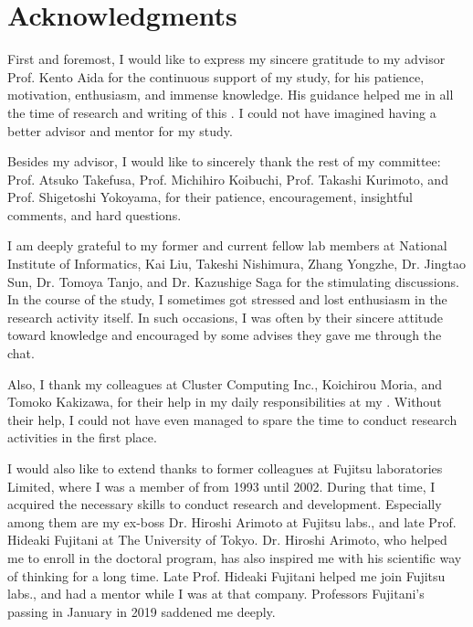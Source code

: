 \chapter*{Acknowledgments}

First and foremost, I would like to express my sincere gratitude to my advisor Prof. Kento Aida for the continuous support of my  study, for his patience, motivation, enthusiasm, and immense knowledge.
His guidance helped me in all the time of research and writing of this .
I could not have imagined having a better advisor and mentor for my  study.

Besides my advisor, I would like to sincerely thank the rest of my  committee: Prof. Atsuko Takefusa, Prof. Michihiro Koibuchi, Prof. Takashi Kurimoto, and Prof. Shigetoshi Yokoyama, for their patience, encouragement, insightful comments, and hard questions.

I am deeply grateful to my former and current fellow lab members at National Institute of Informatics, Kai Liu, Takeshi Nishimura, Zhang Yongzhe, Dr. Jingtao Sun, Dr. Tomoya Tanjo, and Dr. Kazushige Saga for the stimulating discussions.
In the course of the study, I sometimes got stressed and lost enthusiasm in the research activity itself.
In such occasions, I was often  by their sincere attitude toward knowledge and encouraged by some advises they gave me through the chat.



Also, I thank my colleagues at Cluster Computing Inc., Koichirou Moria, and Tomoko Kakizawa, for their help in my daily responsibilities at my .
Without their help, I could not have even managed to spare the time to conduct research activities in the first place.



I would also like to extend thanks to former colleagues at Fujitsu laboratories Limited, where I was a member of from 1993 until 2002.
During that time, I acquired the necessary skills to conduct research and development.
Especially among them are my ex-boss Dr. Hiroshi Arimoto at Fujitsu labs., and late Prof. Hideaki Fujitani at The University of Tokyo.
Dr. Hiroshi Arimoto, who helped me to enroll in the doctoral program, has also inspired me with his scientific way of thinking for a long time.
Late Prof. Hideaki Fujitani helped me  join Fujitsu labs., and had  a mentor while I was at that company.
Professors Fujitani's passing in January in 2019 saddened me deeply.



